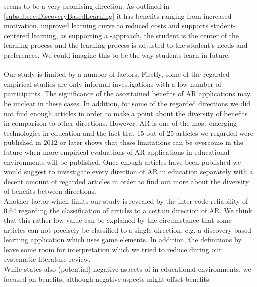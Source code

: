 \DBL seems to be a very promising \AR direction. As outlined in \ref{subsubsec:DiscoveryBasedLearning} it has benefits ranging from increased motivation, improved learning curve to reduced costs and supports student-centered learning, as supporting a \DBLns-approach, the student is the center of the learning process and the learning process is adjusted to the student's needs and preferences. We could imagine this to be the way students learn in future. \\
\\
Our study is limited by a number of factors. Firstly, some of the regarded empirical studies are only informal investigations with a low number of participants. The significance of the ascertained benefits of AR applications may be unclear in these cases. In addition, for some of the regarded directions we did not find enough articles in order to make a point about the diversity of benefits in comparison to other directions. However, AR is one of the most emerging technologies in education and the fact that 15 out of 25 articles we regarded were published in 2012 or later shows that these limitations can be overcome in the future when more empirical evaluations of AR applications in educational environments will be published. Once enough articles have been published we would suggest to investigate every direction of AR in education separately with a decent amount of regarded articles in order to find out more about the diversity of benefits between directions. \\

Another factor which limits our study is revealed by the inter-code reliability of 0.64 regarding the classification of articles to a certain direction of AR. We think that this rather low value can be explained by the circumstance that some articles can not precisely be classified to a single direction, e.g. a discovery-based learning application which uses game elements. In addition, the definitions by \cite{Yuen.2011} leave some room for interpretation which we tried to reduce during our systematic literature review.
\\

While \cite{Radu.2014} states also (potential) negative aspects of \AR in educational environments, we focused on benefits, although negative aspects might offset benefits. \\

